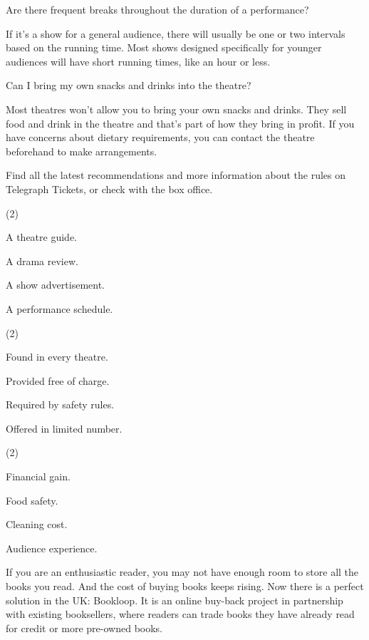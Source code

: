 \documentclass{英语试卷}
\begin{document}
\par Are there frequent breaks throughout the duration of a performance?\par
\par If it's a show for a general audience, there will usually be one or two intervals based on the running time. Most shows designed specifically for younger audiences will have short running times, like an hour or less.\par
\par Can I bring my own snacks and drinks into the theatre?\par
\par Most theatres won't allow you to bring your own snacks and drinks. They sell food and drink in the theatre and that's part of how they bring in profit. If you have concerns about dietary requirements, you can contact the theatre beforehand to make arrangements.\par
\par Find all the latest recommendations and more information about the rules on Telegraph Tickets, or check with the box office.\par
{}
\begin{choices}(2)
  \item A theatre guide.
  \item A drama review.
  \item A show advertisement.
  \item A performance schedule.
\end{choices}
\begin{choices}(2)
  \item Found in every theatre.
  \item Provided free of charge.
  \item Required by safety rules.
  \item Offered in limited number.
\end{choices}
\begin{choices}(2)
  \item Financial gain.
  \item Food safety.
  \item Cleaning cost.
  \item Audience experience.
\end{choices}
\par If you are an enthusiastic reader, you may not have enough room to store all the books you read. And the cost of buying books keeps rising. Now there is a perfect solution in the UK: Bookloop. It is an online buy-back project in partnership with existing booksellers, where readers can trade books they have already read for credit or more pre-owned books.\par
\end{document}
